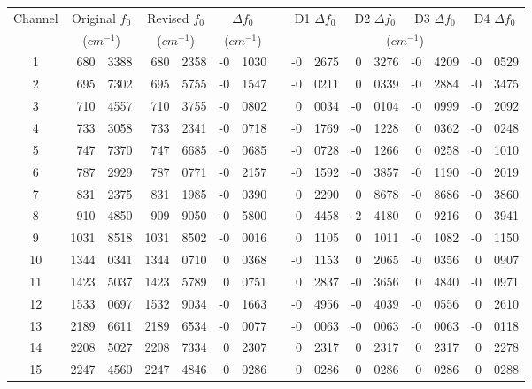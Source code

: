 \begin{table}[htp]
  \centering
  \begin{tabular}{c *{3}{r@{.}l} c *{4}{r@{.}l}}
    \hline
    Channel & \multicolumn{2}{c}{Original $f_0$} & \multicolumn{2}{c}{Revised $f_0$} & \multicolumn{2}{c}{$\Delta f_0$} & & \multicolumn{2}{c}{D1 $\Delta f_0$} & \multicolumn{2}{c}{D2 $\Delta f_0$} & \multicolumn{2}{c}{D3 $\Delta f_0$} & \multicolumn{2}{c}{D4 $\Delta f_0$} \\
            & \multicolumn{2}{c}{($cm^{-1}$)}    & \multicolumn{2}{c}{($cm^{-1}$)}   & \multicolumn{2}{c}{($cm^{-1}$)} & &  \multicolumn{8}{c}{($cm^{-1}$)}\\
    \hline\hline
       1    &  680&3388 &  680&2358 & -0&1030 & & -0&2675 &  0&3276 & -0&4209 & -0&0529 \\
       2    &  695&7302 &  695&5755 & -0&1547 & & -0&0211 &  0&0339 & -0&2884 & -0&3475 \\
       3    &  710&4557 &  710&3755 & -0&0802 & &  0&0034 & -0&0104 & -0&0999 & -0&2092 \\
       4    &  733&3058 &  733&2341 & -0&0718 & & -0&1769 & -0&1228 &  0&0362 & -0&0248 \\
       5    &  747&7370 &  747&6685 & -0&0685 & & -0&0728 & -0&1266 &  0&0258 & -0&1010 \\
       6    &  787&2929 &  787&0771 & -0&2157 & & -0&1592 & -0&3857 & -0&1190 & -0&2019 \\
       7    &  831&2375 &  831&1985 & -0&0390 & &  0&2290 &  0&8678 & -0&8686 & -0&3860 \\
       8    &  910&4850 &  909&9050 & -0&5800 & & -0&4458 & -2&4180 &  0&9216 & -0&3941 \\
       9    & 1031&8518 & 1031&8502 & -0&0016 & &  0&1105 &  0&1011 & -0&1082 & -0&1150 \\
      10    & 1344&0341 & 1344&0710 &  0&0368 & & -0&1153 &  0&2065 & -0&0356 &  0&0907 \\
      11    & 1423&5037 & 1423&5789 &  0&0751 & &  0&2837 & -0&3656 &  0&4840 & -0&0971 \\
      12    & 1533&0697 & 1532&9034 & -0&1663 & & -0&4956 & -0&4039 & -0&0556 &  0&2610 \\
      13    & 2189&6611 & 2189&6534 & -0&0077 & & -0&0063 & -0&0063 & -0&0063 & -0&0118 \\
      14    & 2208&5027 & 2208&7334 &  0&2307 & &  0&2317 &  0&2317 &  0&2317 &  0&2278 \\
      15    & 2247&4560 & 2247&4846 &  0&0286 & &  0&0286 &  0&0286 &  0&0286 &  0&0288 \\

\end{tabular}
\end{table}

